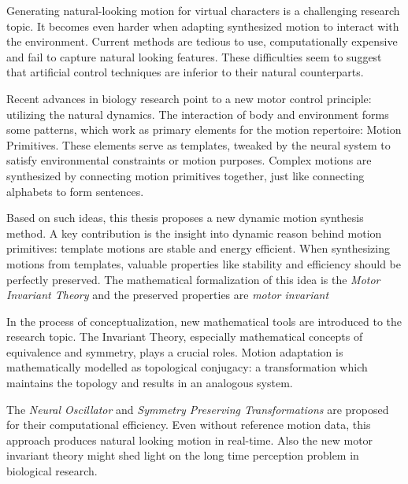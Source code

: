 


\begin{abstracts}        %

Generating natural-looking motion for virtual characters is a challenging research topic.
It becomes even harder when adapting synthesized motion to interact with the environment. 
Current methods are tedious to use, computationally expensive and fail to capture natural looking features.
These difficulties seem to suggest that artificial control techniques are inferior to their natural counterparts.

Recent advances in biology research point to a new motor control principle: utilizing the natural dynamics.
The interaction of body and environment forms some patterns, which work as primary elements for the motion repertoire: Motion Primitives.
These elements serve as templates, tweaked by the neural system to satisfy  environmental constraints or motion purposes.
Complex motions are synthesized by connecting motion primitives together, just like connecting alphabets to form sentences.



Based on such ideas,   this thesis proposes a new dynamic motion synthesis method.
A key contribution is the insight into dynamic reason behind motion primitives: template motions are stable and energy efficient. 
When synthesizing motions from templates, valuable properties  like stability and efficiency should be perfectly preserved.
The mathematical formalization of this idea is the \emph{Motor Invariant Theory} and the preserved properties are \emph{motor invariant}

In the process of conceptualization, new mathematical tools are introduced to the research topic.
The Invariant Theory, especially mathematical concepts of equivalence and symmetry, plays a crucial roles.
Motion adaptation is mathematically modelled as topological conjugacy: a transformation which maintains the topology and results in an analogous system.

The \emph{Neural Oscillator} and \emph{Symmetry Preserving Transformations} are proposed for their computational efficiency.
Even without reference motion data, this approach produces natural looking motion in real-time.
Also the new motor invariant theory might  shed light on the long time perception problem in biological research.

\end{abstracts}





